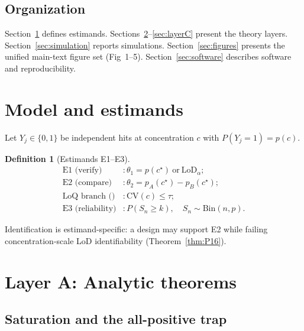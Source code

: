 \documentclass[11pt,a4paper]{article}
\theoremstyle{definition}
\newtheorem{definition}[theorem]{Definition}
\begin{document}
\subsection{Organization}

Section~\ref{sec:model} defines estimands.
Sections~\ref{sec:layerA}--\ref{sec:layerC} present the theory layers.
Section~\ref{sec:simulation} reports simulations.
Section~\ref{sec:figures} presents the unified main-text figure set (Fig~1--5).
Section~\ref{sec:software} describes software and reproducibility.

\section{Model and estimands}
\label{sec:model}

Let $Y_j\in\{0,1\}$ be independent hits at concentration $c$ with $P(Y_j=1)=p(c)$.

\begin{definition}[Estimands E1--E3]
\begin{align*}
  \text{E1 (verify)} &: \theta_1 = p(c^\star)\ \text{or}\ \mathrm{LoD}_\alpha; \\
  \text{E2 (compare)} &: \theta_2 = p_A(c^\star) - p_B(c^\star); \\
  \text{LoQ branch ()} &: \mathrm{CV}(c) \le \tau; \\
  \text{E3 (reliability)} &: P(S_n \ge k),\quad S_n \sim \mathrm{Bin}(n,p).
\end{align*}
\end{definition}

Identification is estimand-specific: a design may support E2 while failing
concentration-scale LoD identifiability (Theorem~\ref{thm:P16}).

\section{Layer A: Analytic theorems}
\label{sec:layerA}

\subsection{Saturation and the all-positive trap}
\end{document}
